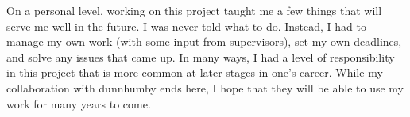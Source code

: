 \documentclass[a4paper, 10pt, english, oneside]{extarticle}
\begin{document}
On a personal level, working on this project taught me a few things that will serve me well in the future. I was never told what to do. Instead, I had to manage my own work (with some input from supervisors), set my own deadlines, and solve any issues that came up. In many ways, I had a level of responsibility in this project that is more common at later stages in one's career. While my collaboration with dunnhumby ends here, I hope that they will be able to use my work for many years to come.
\end{document}
